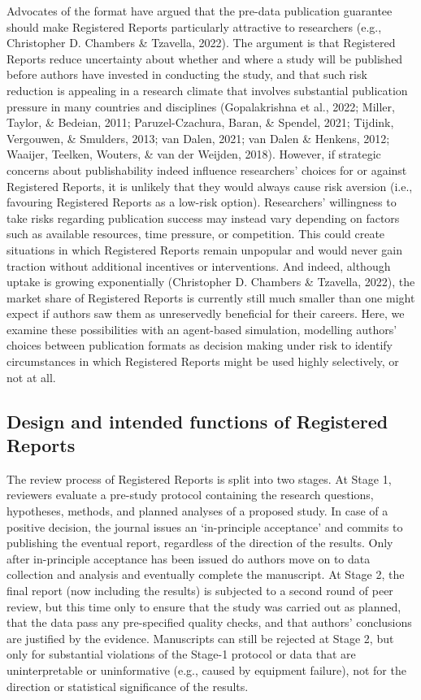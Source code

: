 \documentclass[
  ,man,mask,floatsintext]{apa6}
\begin{document}
Advocates of the format have argued that the pre-data publication guarantee should make Registered Reports particularly attractive to researchers (e.g., Christopher D. Chambers \& Tzavella, 2022).
The argument is that Registered Reports reduce uncertainty about whether and where a study will be published before authors have invested in conducting the study, and that such risk reduction is appealing
in a research climate that involves substantial publication pressure in many countries and disciplines (Gopalakrishna et al., 2022; Miller, Taylor, \& Bedeian, 2011; Paruzel-Czachura, Baran, \& Spendel, 2021; Tijdink, Vergouwen, \& Smulders, 2013; van Dalen, 2021; van Dalen \& Henkens, 2012; Waaijer, Teelken, Wouters, \& van der Weijden, 2018).
However, if strategic concerns about publishability indeed influence researchers' choices for or against Registered Reports, it is unlikely that they would always cause risk aversion (i.e., favouring Registered Reports as a low-risk option).
Researchers' willingness to take risks regarding publication success may instead vary depending on factors such as available resources, time pressure, or competition.
This could create situations in which Registered Reports remain unpopular and would never gain traction without additional incentives or interventions.
And indeed, although uptake is growing exponentially (Christopher D. Chambers \& Tzavella, 2022), the market share of Registered Reports is currently still much smaller than one might expect if authors saw them as unreservedly beneficial for their careers.
Here, we examine these possibilities with an agent-based simulation, modelling authors' choices between publication formats as decision making under risk to identify circumstances in which Registered Reports might be used highly selectively, or not at all.

\hypertarget{design-and-intended-functions-of-registered-reports}{%
\subsection{Design and intended functions of Registered Reports}\label{design-and-intended-functions-of-registered-reports}}

The review process of Registered Reports is split into two stages.
At Stage 1, reviewers evaluate a pre-study protocol containing the research questions, hypotheses, methods, and planned analyses of a proposed study.
In case of a positive decision, the journal issues an `in-principle acceptance' and commits to publishing the eventual report, regardless of the direction of the results.
Only after in-principle acceptance has been issued do authors move on to data collection and analysis and eventually complete the manuscript.
At Stage 2, the final report (now including the results) is subjected to a second round of peer review, but this time only to ensure that the study was carried out as planned, that the data pass any pre-specified quality checks, and that authors' conclusions are justified by the evidence.
Manuscripts can still be rejected at Stage 2, but only for substantial violations of the Stage-1 protocol or data that are uninterpretable or uninformative (e.g., caused by equipment failure), not for the direction or statistical significance of the results.
\end{document}
